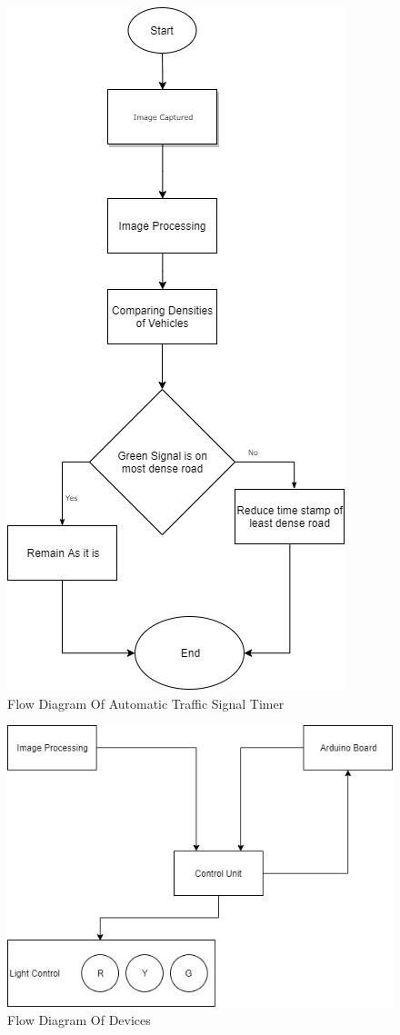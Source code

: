 \documentclass[]{article}
\begin{document}
\begin{figure}[!htb]
\begin{center}
\includegraphics[scale=.65]{1.jpg}
\caption{Flow Diagram Of Automatic Traffic Signal Timer}
\end{center}
\end{figure}

\begin{figure}[!htb]
\begin{center}
\includegraphics[scale=.70]{2.jpg}
\caption{Flow Diagram Of Devices}
\end{center}
\end{figure}
\end{document}
